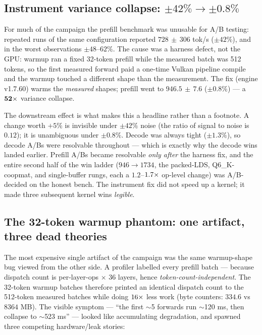 \documentclass[11pt]{article}
\begin{document}
\subsection{Instrument variance collapse: $\pm42\% \to \pm0.8\%$}
\label{sec:variance}

For much of the campaign the prefill benchmark was unusable for A/B testing: repeated runs of the same
configuration reported $728\,{\pm}\,306$ tok/s ($\pm42\%$), and in the worst observations $\pm48$--$62\%$.
The cause was a harness defect, not the GPU: warmup ran a fixed 32-token prefill while the measured batch
was 512 tokens, so the first measured forward paid a one-time Vulkan pipeline compile and the warmup
touched a different shape than the measurement. The fix (engine v1.7.60) warms the \emph{measured} shapes;
prefill went to $946.5\,{\pm}\,7.6$ ($\pm0.8\%$) --- a $\mathbf{52\times}$ variance collapse.

The downstream effect is what makes this a headline rather than a footnote. A change worth $+5\%$ is
invisible under $\pm42\%$ noise (the ratio of signal to noise is $0.12$); it is unambiguous under
$\pm0.8\%$. Decode was always tight ($\pm1.3\%$), so decode A/Bs were resolvable throughout --- which is
exactly why the decode wins landed earlier. Prefill A/Bs became resolvable \emph{only after} the harness
fix, and the entire second half of the win ladder ($946\to1734$, the packed-LDS, Q6\_K-coopmat, and
single-buffer rungs, each a $1.2$--$1.7\times$ op-level change) was A/B-decided on the honest bench. The
instrument fix did not speed up a kernel; it made three subsequent kernel wins \emph{legible}.

\subsection{The 32-token warmup phantom: one artifact, three dead theories}
\label{sec:phantom}

The most expensive single artifact of the campaign was the same warmup-shape bug viewed from the other
side. A profiler labelled every prefill batch  --- because dispatch count is
per-layer-ops $\times$ 36 layers, hence \emph{token-count-independent}. The 32-token warmup batches
therefore printed an identical dispatch count to the 512-token measured batches while doing $16\times$ less
work (byte counters: $334.6$ vs $8364$ MB). The visible symptom --- ``the first $\sim$5 forwards run
$\sim$120 ms, then collapse to $\sim$523 ms'' --- looked like accumulating degradation, and spawned three
competing hardware/leak stories:
\end{document}
